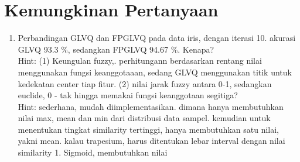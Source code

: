 \section{Kemungkinan Pertanyaan}

\begin{enumerate}
  \item Perbandingan GLVQ dan FPGLVQ pada data iris, dengan iterasi 10.
  akurasi GLVQ 93.3 \%, sedangkan FPGLVQ 94.67 \%. Kenapa? \\ 
  Hint: (1) Keungulan fuzzy,. perhitungann berdasarkan rentang nilai menggunakan
  fungsi keanggotaaan, sedang GLVQ menggunakan titik untuk kedekatan center
  tiap fitur. (2) nilai jarak fuzzy antara 0-1, sedangkan euclide, 0 - tak
  hingga
  \Kenapa memakai fungsi keanggotaan segitiga? \\
  Hint: sederhana, mudah diimplementasikan. dimana hanya membutuhkan nilai max,
  mean dan min dari distribusi data sampel. kemudian untuk menentukan tingkat
  similarity tertinggi, hanya membutuhkan satu nilai, yakni mean. kalau
  trapesium, harus ditentukan lebar interval dengan nilai similarity 1. Sigmoid,
  membutuhkan nilai 
\end{enumerate}